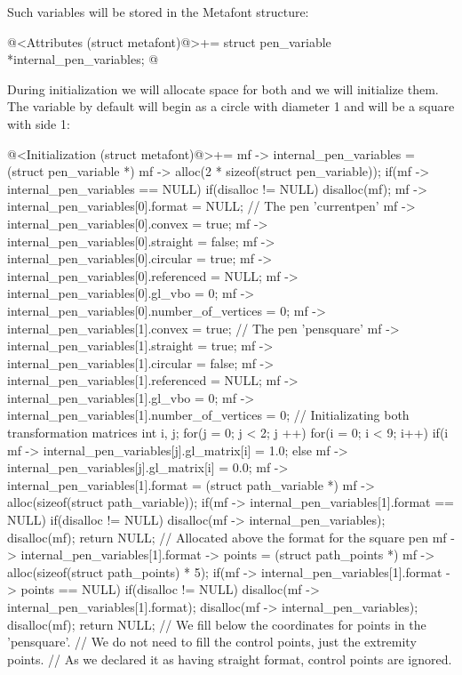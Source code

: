 Such variables will be stored in the Metafont structure:

\iniciocodigo
@<Attributes (struct metafont)@>+=
struct pen_variable *internal_pen_variables;
@
\fimcodigo

During initialization we will allocate space for both and we will
initialize them. The variable  by default will
begin as a circle with diameter 1 and  will be a
square with side 1:

\iniciocodigo
@<Initialization (struct metafont)@>+=
mf -> internal_pen_variables = (struct pen_variable *)
                                 mf -> alloc(2 * sizeof(struct pen_variable));
if(mf -> internal_pen_variables == NULL){
  if(disalloc != NULL)
    disalloc(mf);
}
mf -> internal_pen_variables[0].format = NULL; // The pen 'currentpen'
mf -> internal_pen_variables[0].convex = true;
mf -> internal_pen_variables[0].straight = false;
mf -> internal_pen_variables[0].circular = true;
mf -> internal_pen_variables[0].referenced = NULL;
mf -> internal_pen_variables[0].gl_vbo = 0;
mf -> internal_pen_variables[0].number_of_vertices = 0;
mf -> internal_pen_variables[1].convex = true; // The pen 'pensquare'
mf -> internal_pen_variables[1].straight = true;
mf -> internal_pen_variables[1].circular = false;
mf -> internal_pen_variables[1].referenced = NULL;
mf -> internal_pen_variables[1].gl_vbo = 0;
mf -> internal_pen_variables[1].number_of_vertices = 0;
{ // Initializating both transformation matrices
  int i, j;
  for(j = 0; j < 2; j ++)
    for(i = 0; i < 9; i++)
      if(i %
        mf -> internal_pen_variables[j].gl_matrix[i] = 1.0;
      else
        mf -> internal_pen_variables[j].gl_matrix[i] = 0.0;
}
mf -> internal_pen_variables[1].format =
    (struct path_variable *) mf -> alloc(sizeof(struct path_variable));
if(mf -> internal_pen_variables[1].format == NULL){
  if(disalloc != NULL){
    disalloc(mf -> internal_pen_variables);
    disalloc(mf);
  }
  return NULL;
} // Allocated above the format for the square pen
mf -> internal_pen_variables[1].format -> points =
    (struct path_points *) mf -> alloc(sizeof(struct path_points) * 5);
if(mf -> internal_pen_variables[1].format -> points == NULL){
  if(disalloc != NULL){
    disalloc(mf -> internal_pen_variables[1].format);
    disalloc(mf -> internal_pen_variables);
    disalloc(mf);
  }
  return NULL;
}
// We fill below the coordinates for points in the 'pensquare'.
// We do not need to fill the control points, just the extremity points.
// As we declared it as having straight format, control points are ignored.
